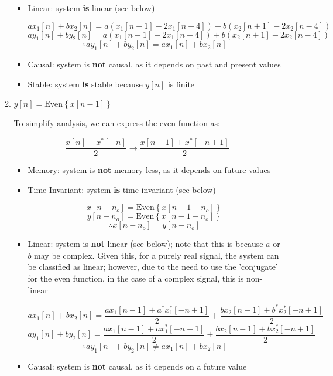 \begin{enumerate}
\begin{enumerate}
\begin{itemize}
          \item Linear: system \textbf{is} linear (see below)

            $$ax_1[n]+bx_2[n]=a(x_1[n+1]-2x_1[n-4])+b(x_2[n+1]-2x_2[n-4])$$
            $$ay_1[n]+by_2[n]=a(x_1[n+1]-2x_1[n-4])+b(x_2[n+1]-2x_2[n-4])$$
            $$\therefore ay_1[n]+by_2[n]=ax_1[n]+bx_2[n]$$

          \item Causal: system is \textbf{not} causal, as it depends on past and present values

          \item Stable: system \textbf{is} stable because $y[n]$ is finite

        \end{itemize}

      \item $y[n]=\text{Even}\left\{ x[n-1] \right\}$

        To simplify analysis, we can express the even function as:

        $$\frac{x[n]+x^*[-n]}{2}\to\frac{x[n-1]+x^*[-n+1]}{2}$$

        \begin{itemize}

          \item Memory: system is \textbf{not} memory-less, as it depends on future values

          \item Time-Invariant: system \textbf{is} time-invariant (see below)

            $$x[n-n_o]=\text{Even}\left\{ x[n-1-n_o] \right\}$$
            $$y[n-n_o]=\text{Even}\left\{ x[n-1-n_o] \right\}$$
            $$\therefore x[n-n_o]=y[n-n_o]$$

          \item Linear: system is \textbf{not} linear (see below); note that this is because $a$ or $b$ may be complex. Given this, for a purely real signal, the system can be classified as linear; however, due to the need to use the 'conjugate' for the even function, in the case of a complex signal, this is non-linear

            $$ax_1[n]+bx_2[n]=\frac{ax_1[n-1]+a^*x_1^*[-n+1]}{2}+\frac{bx_2[n-1]+b^*x_2^*[-n+1]}{2}$$
            $$ay_1[n]+by_2[n]=\frac{ax_1[n-1]+ax_1^*[-n+1]}{2}+\frac{bx_2[n-1]+bx_2^*[-n+1]}{2}$$
            $$\therefore ay_1[n]+by_2[n]\neq ax_1[n]+bx_2[n]$$

          \item Causal: system is \textbf{not} causal, as it depends on a future value


\end{itemize}
\end{enumerate}
\end{enumerate}
